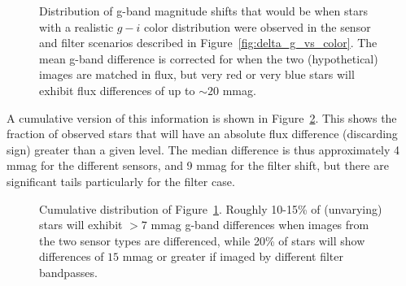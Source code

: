 \documentclass[DM,toc]{lsstdoc}
\begin{document}
\begin{figure}
\caption{Distribution of g-band magnitude shifts that would be when stars with a
realistic $g-i$ color distribution were observed in the sensor and filter
scenarios described in Figure~\ref{fig:delta_g_vs_color}. The mean g-band
difference is corrected for when the two (hypothetical) images are matched in flux,
but very red or very blue stars will exhibit flux differences of up to $\sim 20$
mmag.
\label{fig:delta_g_histogram}}
\end{figure}

A cumulative version of this information is shown in
Figure~\ref{fig:delta_g_cumulative}. This shows the fraction of observed
stars that will have an absolute flux difference (discarding sign) greater than
a given level. The median difference is thus approximately 4 mmag for the
different sensors, and 9 mmag for the filter shift, but there are significant
tails particularly for the filter case.

\begin{figure}
\caption{Cumulative distribution of Figure~\ref{fig:delta_g_histogram}. Roughly
10-15\% of (unvarying) stars will exhibit $>7$ mmag g-band differences when
images from the two sensor types are differenced, while 20\% of stars will show
differences of $15$ mmag or greater if imaged by different filter bandpasses.
\label{fig:delta_g_cumulative}}
\end{figure}
\end{document}
